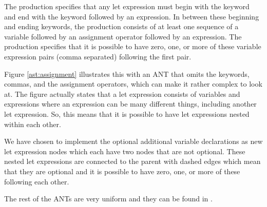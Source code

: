 The production specifies that any let expression must begin with the keyword
 and end with the keyword  followed by an expression. In
between these beginning and ending keywords, the production consists of at least
one sequence of a variable followed by an assignment operator followed by an
expression. The production specifies that it is possible to have zero, one, or
more of these variable expression pairs (comma separated) following the first
pair.



Figure \ref{ast:assignment} illustrates this with an ANT that omits the
keywords, commas, and the assignment operators, which can make it rather complex
to look at. The figure actually states that a let expression consists of variables
and expressions where an expression can be many different things, including
another let expression. So, this means that it is possible to have let
expressions nested within each other. 

We have chosen to implement the optional additional variable declarations as new
let expression nodes which each have two nodes that are not optional. These
nested let expressions are connected to the parent with dashed edges which mean
that they are optional and it is possible to have zero, one, or more of these
following each other.

The rest of the ANTs are very uniform and they can be found in .

